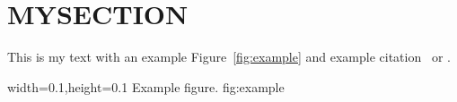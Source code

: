 

\chapter{MYSECTION}

This is my text with an example Figure~\ref{fig:example} and example
citation~\cite{Voit2011} or \textcite{Voit2009}.

      {width=0.1\textwidth,height=0.1\textheight}%
      {Example figure.}%
      {fig:example}%



